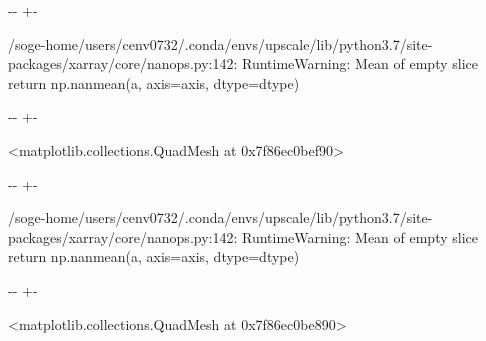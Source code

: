 \documentclass[letterpaper,10pt,english]{sphinxmanual}
\newlength\nbsphinxcodecellspacing
\begin{document}
{

\kern-\sphinxverbatimsmallskipamount\kern-\baselineskip
\kern+\FrameHeightAdjust\kern-\fboxrule
\vspace{\nbsphinxcodecellspacing}

\begin{sphinxVerbatim}[commandchars=\\\{\}]
/soge-home/users/cenv0732/.conda/envs/upscale/lib/python3.7/site-packages/xarray/core/nanops.py:142: RuntimeWarning: Mean of empty slice
  return np.nanmean(a, axis=axis, dtype=dtype)
\end{sphinxVerbatim}
}

{

\kern-\sphinxverbatimsmallskipamount\kern-\baselineskip
\kern+\FrameHeightAdjust\kern-\fboxrule
\vspace{\nbsphinxcodecellspacing}

\begin{sphinxVerbatim}[commandchars=\\\{\}]
\llap{\color{nbsphinxout}[57]:\,\hspace{\fboxrule}\hspace{\fboxsep}}<matplotlib.collections.QuadMesh at 0x7f86ec0bef90>
\end{sphinxVerbatim}
}

{

\kern-\sphinxverbatimsmallskipamount\kern-\baselineskip
\kern+\FrameHeightAdjust\kern-\fboxrule
\vspace{\nbsphinxcodecellspacing}

\begin{sphinxVerbatim}[commandchars=\\\{\}]
/soge-home/users/cenv0732/.conda/envs/upscale/lib/python3.7/site-packages/xarray/core/nanops.py:142: RuntimeWarning: Mean of empty slice
  return np.nanmean(a, axis=axis, dtype=dtype)
\end{sphinxVerbatim}
}

{

\kern-\sphinxverbatimsmallskipamount\kern-\baselineskip
\kern+\FrameHeightAdjust\kern-\fboxrule
\vspace{\nbsphinxcodecellspacing}

\begin{sphinxVerbatim}[commandchars=\\\{\}]
\llap{\color{nbsphinxout}[57]:\,\hspace{\fboxrule}\hspace{\fboxsep}}<matplotlib.collections.QuadMesh at 0x7f86ec0be890>
\end{sphinxVerbatim}
}
\end{document}
